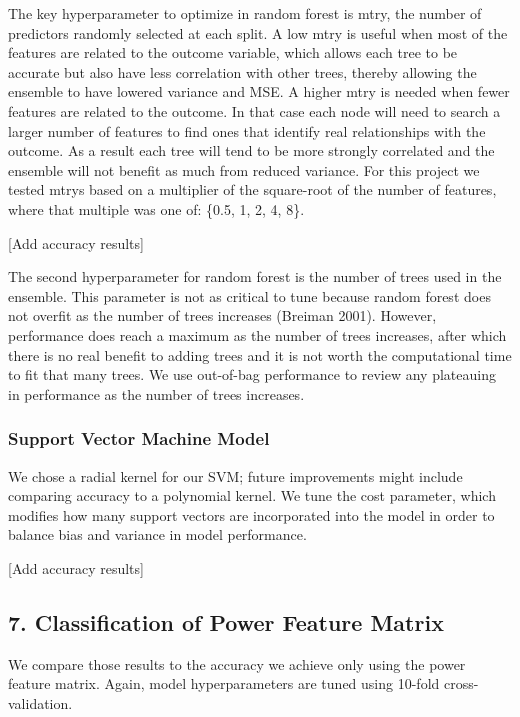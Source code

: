 \documentclass[12pt,]{article}
\begin{document}
The key hyperparameter to optimize in random forest is mtry, the number
of predictors randomly selected at each split. A low mtry is useful when
most of the features are related to the outcome variable, which allows
each tree to be accurate but also have less correlation with other
trees, thereby allowing the ensemble to have lowered variance and MSE. A
higher mtry is needed when fewer features are related to the outcome. In
that case each node will need to search a larger number of features to
find ones that identify real relationships with the outcome. As a result
each tree will tend to be more strongly correlated and the ensemble will
not benefit as much from reduced variance. For this project we tested
mtrys based on a multiplier of the square-root of the number of
features, where that multiple was one of: \{0.5, 1, 2, 4, 8\}.

{[}Add accuracy results{]}

The second hyperparameter for random forest is the number of trees used
in the ensemble. This parameter is not as critical to tune because
random forest does not overfit as the number of trees increases (Breiman
2001). However, performance does reach a maximum as the number of trees
increases, after which there is no real benefit to adding trees and it
is not worth the computational time to fit that many trees. We use
out-of-bag performance to review any plateauing in performance as the
number of trees increases.

\subsubsection{Support Vector Machine
Model}\label{support-vector-machine-model}

We chose a radial kernel for our SVM; future improvements might include
comparing accuracy to a polynomial kernel. We tune the cost parameter,
which modifies how many support vectors are incorporated into the model
in order to balance bias and variance in model performance.

{[}Add accuracy results{]}

\subsection{7. Classification of Power Feature
Matrix}\label{classification-of-power-feature-matrix}

We compare those results to the accuracy we achieve only using the power
feature matrix. Again, model hyperparameters are tuned using 10-fold
cross-validation.
\end{document}
